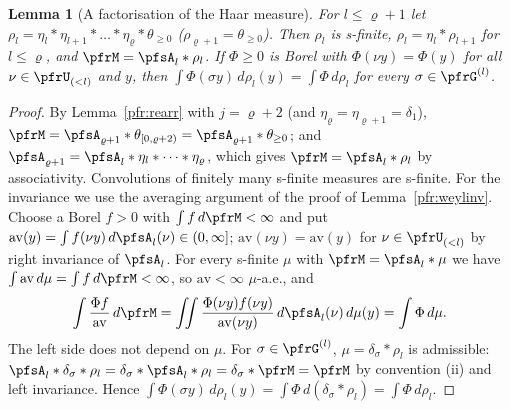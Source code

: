 \documentclass[10pt]{amsart}
\newtheorem{lemma}[theorem]{Lemma}
\theoremstyle{definition}
\theoremstyle{remark}
\begin{document}
\begin{lemma}[A factorisation of the Haar measure]\label{pfs:factor}
For $l\le\varrho+1$ let $\rho_l=\eta_l*\eta_{l+1}*\dots*\eta_\varrho*\theta_{\ge0}$ ($\rho_{\varrho+1}=\theta_{\ge0}$). Then
$\rho_l$ is s-finite, $\rho_l=\eta_l*\rho_{l+1}$ for $l\le\varrho$, and $\pfrM=\pfsA_l*\rho_l$. If $\Phi\ge0$ is Borel with
$\Phi(\nu y)=\Phi(y)$ for all $\nu\in\pfrU_{(<l)}$ and $y$, then $\int\Phi(\sigma y)\,d\rho_l(y)=\int\Phi\,d\rho_l$ for every
$\sigma\in\pfrG^{(l)}$.
\end{lemma}
\begin{proof}
By Lemma~\ref{pfr:rearr} with $j=\varrho+2$ (and $\eta_\varrho=\eta_{\varrho+1}=\delta_1$), $\pfrM=\pfsA_{\varrho+1}*\theta_{[0,\varrho+2)}=
\pfsA_{\varrho+1}*\theta_{\ge0}$; and $\pfsA_{\varrho+1}=\pfsA_l*\eta_l*\dots*\eta_\varrho$, which gives $\pfrM=\pfsA_l*\rho_l$ by associativity.
Convolutions of finitely many s-finite measures are s-finite. For the invariance we use the averaging argument of
the proof of Lemma~\ref{pfr:weylinv}. Choose a Borel $f>0$ with $\int f\,d\pfrM<\infty$ and put
$\mathrm{av}(y)=\int f(\nu y)\,d\pfsA_l(\nu)\in(0,\infty]$; $\mathrm{av}(\nu y)=\mathrm{av}(y)$ for $\nu\in\pfrU_{(<l)}$
by right invariance of $\pfsA_l$. For every s-finite $\mu$ with $\pfrM=\pfsA_l*\mu$ we have $\int\mathrm{av}\,d\mu=\int f\,d\pfrM<\infty$,
so $\mathrm{av}<\infty$ $\mu$-a.e., and
\[
\int\frac{\Phi f}{\mathrm{av}}\,d\pfrM=\iint\frac{\Phi(\nu y)f(\nu y)}{\mathrm{av}(\nu y)}\,d\pfsA_l(\nu)\,d\mu(y)=\int\Phi\,d\mu .
\]
The left side does not depend on $\mu$. For $\sigma\in\pfrG^{(l)}$, $\mu=\delta_\sigma*\rho_l$ is admissible:
$\pfsA_l*\delta_\sigma*\rho_l=\delta_\sigma*\pfsA_l*\rho_l=\delta_\sigma*\pfrM=\pfrM$ by convention (ii) and left invariance. Hence
$\int\Phi(\sigma y)\,d\rho_l(y)=\int\Phi\,d(\delta_\sigma*\rho_l)=\int\Phi\,d\rho_l$.
\end{proof}
\end{document}
